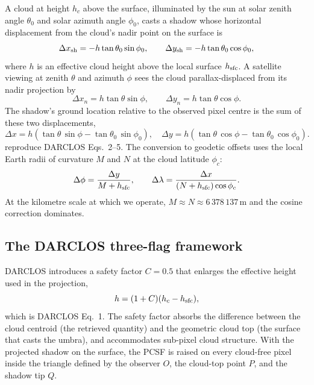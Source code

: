 \documentclass[11pt,a4paper]{article}
\begin{document}
A cloud at height $h_c$ above the surface, illuminated by the sun at
solar zenith angle $\theta_0$ and solar azimuth angle $\phi_0$, casts a
shadow whose horizontal displacement from the cloud's nadir point on the
surface is
\begin{equation}
\Delta x_{\rm sh} = -h \tan\theta_0 \sin\phi_0,
\qquad
\Delta y_{\rm sh} = -h \tan\theta_0 \cos\phi_0,
\label{eq:shadow-from-cloud}
\end{equation}
where $h$ is an effective cloud height above the local surface
$h_{\rm sfc}$. A satellite viewing at zenith $\theta$ and azimuth $\phi$
sees the cloud parallax-displaced from its nadir projection by
\begin{equation}
\Delta x_n = h \tan\theta \sin\phi,
\qquad
\Delta y_n = h \tan\theta \cos\phi.
\label{eq:parallax}
\end{equation}
The shadow's ground location relative to the observed pixel centre is
the sum of these two displacements,
\begin{equation}
\Delta x = h \left(\tan\theta\,\sin\phi - \tan\theta_0\,\sin\phi_0\right),
\quad
\Delta y = h \left(\tan\theta\,\cos\phi - \tan\theta_0\,\cos\phi_0\right).
\label{eq:total-displacement}
\end{equation}
 reproduce DARCLOS
Eqs.~2--5. The conversion to geodetic offsets uses the local Earth radii
of curvature $M$ and $N$ at the cloud latitude $\phi_c$:
\begin{equation}
\Delta\phi = \frac{\Delta y}{M + h_{\rm sfc}},
\qquad
\Delta\lambda = \frac{\Delta x}{(N + h_{\rm sfc})\cos\phi_c}.
\label{eq:geodetic-offsets}
\end{equation}
At the kilometre scale at which we operate,
$M \approx N \approx 6\,378\,137$\,m and the cosine correction
dominates.

\subsection{The DARCLOS three-flag framework}\label{sec:darclos}

DARCLOS introduces a safety factor $C = 0.5$ that enlarges the
effective height used in the projection,
\begin{equation}
h = (1+C)(h_c - h_{\rm sfc}),
\label{eq:safety-factor}
\end{equation}
which is DARCLOS Eq.~1. The safety factor absorbs the difference between
the cloud centroid (the retrieved quantity) and the geometric cloud top
(the surface that casts the umbra), and accommodates sub-pixel cloud
structure. With the projected shadow on the surface, the PCSF is raised
on every cloud-free pixel inside the triangle defined by the observer
$O$, the cloud-top point $P$, and the shadow tip $Q$.
\end{document}
